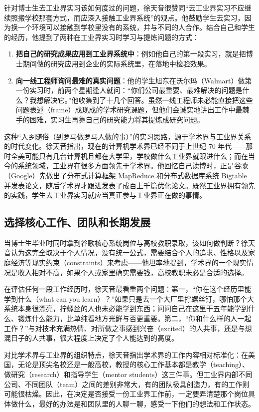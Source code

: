 \documentclass[UTF8,a4paper,11pt,fontset=fandol]{ctexart}
\begin{document}
针对博士生去工业界实习该如何度过的问题，徐天音很赞同“去工业界实习不应继续照搬学校那套方式，而应深入接触工业界系统”的观点。他鼓励学生去实习，因为换一个环境可以接触到学校里没有的系统，并与不同的人合作。结合自己和学生的经历，他提到了两种在工业界实习时学习与提炼问题的方式：
\begin{enumerate}
\item \textbf{把自己的研究成果应用到工业界系统中}：例如他自己的第一段实习，就是把博士期间做的研究应用到企业的实际系统里，在落地中检验效果。
\item \textbf{向一线工程师询问最难的真实问题}：他的学生旭东在沃尔玛（Walmart）做第一份实习时，前两个星期逢人就问：“你们公司最重要、最难解决的问题是什么？我想解决它。”他收集到了十几个回答。虽然一线工程师未必能直接把这些问题表述（frame）成现成的学术研究课题，但他们会诚实地讲出工作中最棘手的困难，实习生再靠自己的研究能力将其提炼成研究问题。
\end{enumerate}

这种“入乡随俗（到罗马做罗马人做的事）”的实习思路，源于学术界与工业界关系的时代变化。徐天音指出，现在的计算机学术界已经不同于上世纪 70 年代——那时全美可能只有几台计算机且都在大学里，学校做什么工业界就跟进什么；而在当今的系统领域，工业界在很多方面领先于学术界。他回忆自己读博时，正是谷歌（Google）先做出了分布式计算框架 MapReduce 和分布式数据库系统 Bigtable 并发表论文，随后学术界才跟进发表了成百上千篇优化论文。既然工业界拥有领先的实践，学生去工业界实习就应当真正参与工业界正在做的事情。

\subsection{选择核心工作、团队和长期发展}
当博士生毕业时同时拿到谷歌核心系统岗位与高校教职录取，该如何做判断？徐天音认为这完全取决于个人情况，没有统一公式，需要结合个人的追求、性格以及家庭经济等现实约束（constraints）来考虑——他坦率地提到，学术界的一个现实情况是收入相对不高，如果个人或家里确实需要钱，高校教职未必是合适的选择。

在评估任何一段工作经历时，徐天音最看重两个问题：第一，“你在这个经历里能学到什么（what can you learn）？”如果只是去一个大厂里拧螺丝钉，哪怕那个大系统本身很漂亮，拧螺丝的人也未必能学到东西；问问自己在这里干五年能学到什么、锻炼什么能力，比单纯看地方光鲜与否更重要。第二，“你和什么样的人一起工作？”与对技术充满热情、对所做之事感到兴奋（excited）的人共事，还是与想混日子的人共事，很大程度上决定了个人能达到的高度。

对比学术界与工业界的组织特点，徐天音指出学术界的工作内容相对标准化：在美国，无论是顶尖名校还是一般高校，教授的核心工作基本都是教学（teaching）、做研究（research）和指导学生（mentor students）这三件事。但工业界内部不同公司、不同团队（team）之间的差别非常大，有的团队极具创造力，有的工作则可能很枯燥。因此，在决定是否接受一份工业界工作前，一定要弄清楚那个岗位具体做什么，最好的办法是和团队里的人聊一聊，感受一下他们的想法和工作状态。
\end{document}
